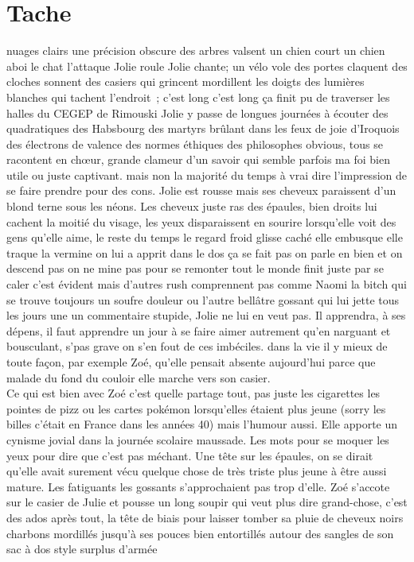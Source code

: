 \documentclass{article}
\begin{document}
 \section*{Tache}
 nuages clairs une précision obscure des arbres valsent un chien court un
 chien aboi le chat l’attaque Jolie roule Jolie chante; un vélo vole des portes
 claquent des cloches sonnent des casiers qui grincent mordillent les doigts
 des lumières blanches qui tachent l’endroit ; c’est long c’est long ça finit
 pu de traverser les halles du  CEGEP de Rimouski Jolie y passe de
 longues journées à écouter des quadratiques des Habsbourg des martyrs brûlant
 dans les feux de joie d’Iroquois des électrons de valence des normes éthiques
 des philosophes obvious, tous se racontent en chœur, grande clameur d’un
 savoir qui semble parfois ma foi bien utile ou juste captivant. mais non la
 majorité du temps à vrai dire l’impression de se faire prendre pour des cons.
 Jolie est rousse mais ses cheveux paraissent d’un blond terne sous les néons.
 Les cheveux juste ras des épaules, bien droits lui cachent la moitié du
 visage, les yeux disparaissent en sourire lorsqu’elle voit des gens qu’elle
 aime, le reste du temps le regard froid glisse caché elle embusque elle traque
 la vermine on lui a apprit dans le dos ça se fait pas on parle en bien et on
 descend pas on ne mine pas pour se remonter tout le monde finit juste par se
 caler c’est évident mais d’autres rush comprennent pas comme Naomi la bitch
 qui se trouve toujours un soufre douleur ou l’autre bellâtre gossant qui lui
 jette tous les jours une un commentaire stupide, Jolie ne lui en veut pas. Il
 apprendra, à ses dépens, il faut apprendre un jour à se faire aimer autrement
 qu’en narguant et bousculant, s’pas grave on s’en fout de ces imbéciles. dans
 la vie il y mieux de toute façon, par exemple Zoé, qu’elle pensait absente
 aujourd’hui parce que malade du fond du couloir elle marche vers son casier.\\

Ce qui est bien avec Zoé c’est quelle partage tout, pas juste les cigarettes
les pointes de pizz ou les cartes pokémon lorsqu’elles étaient plus jeune
(sorry les billes c’était en France dans les années 40) mais l’humour aussi.
Elle apporte un cynisme jovial dans la journée scolaire maussade. Les mots pour
se moquer les yeux pour dire que c’est pas méchant.  Une tête sur les épaules,
on se dirait qu’elle avait surement vécu quelque chose de très triste plus jeune
à être aussi mature. Les fatiguants les gossants s’approchaient pas trop d’elle.
Zoé s’accote sur le casier de Julie et pousse un long soupir qui veut plus dire
grand-chose, c’est des ados après tout, la tête de biais pour laisser tomber sa
pluie de cheveux noirs charbons mordillés jusqu'à ses pouces bien entortillés
autour des sangles de son sac à dos style surplus d'armée
\end{document}
